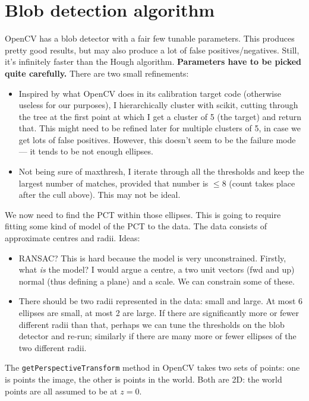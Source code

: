 \section{Blob detection algorithm}
OpenCV has a blob detector with a fair few tunable parameters. This produces pretty good results,
but may also produce a lot of false positives/negatives. Still, it's infinitely faster than the
Hough algorithm. \textbf{Parameters have to be picked quite carefully.} There are two small refinements:
\begin{itemize}
\item Inspired by what OpenCV does in its calibration target code (otherwise useless for our
purposes), I hierarchically cluster with scikit, cutting through the tree at the first point
at which I get a cluster of 5 (the target) and return that. This might need to be refined later
for multiple clusters of 5, in case we get lots of false positives. However, this doesn't seem
to be the failure mode --- it tends to be not enough ellipses.
\item Not being sure of maxthresh, I iterate through all the thresholds and keep the largest number of
matches, provided that number is $\le 8$ (count takes place after the cull above). This may not be ideal.
\end{itemize}


We now need to find the PCT within those ellipses. This is going to require fitting some kind of
model of the PCT to the data. The data consists of approximate centres and radii. 
Ideas:
\begin{itemize}
\item RANSAC? This is hard because the model is very unconstrained. Firstly, what \emph{is} the
model? I would argue a centre, a two unit vectors (fwd and up) normal (thus defining a plane) and a scale.
We can constrain some of these.
\item There should be two radii represented in the data: small and large. At most 6 ellipses are small, at most
2 are large. If there are significantly more or fewer different radii than that, perhaps we can tune the thresholds on the blob
detector and re-run; similarly if there are many more or fewer ellipses of the two different radii.
\end{itemize}
The \verb+getPerspectiveTransform+ method in OpenCV takes two sets of 
points: one is points the image, the other is points in the world. Both are 2D: the world points
are all assumed to be at $z=0$. 

